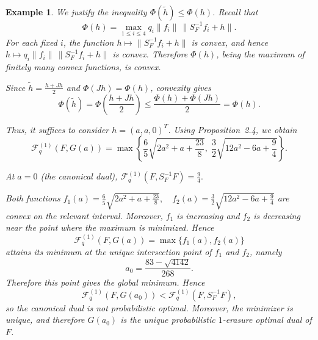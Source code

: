 \documentclass[final,1p,times]{elsarticle}
\newtheorem{example}[thm]{Example}
\begin{document}
\begin{example}
We justify the inequality $\Phi(\widetilde{h})\le \Phi(h)$. 
Recall that
\[
\Phi(h)=\max_{1\le i\le 4} q_i \|f_i\|\,\|S_F^{-1}f_i+h\|.
\]
For each fixed $i$, the function $h \mapsto \|S_F^{-1}f_i+h\|$
is convex, and hence $h \mapsto q_i\|f_i\|\,\|S_F^{-1}f_i+h\|$ is convex. Therefore $\Phi(h)$, being the maximum of finitely many convex functions, is convex.

Since $\widetilde{h}=\frac{h+Jh}{2}$ and $\Phi(Jh)=\Phi(h)$, convexity gives
\[
\Phi(\widetilde{h})
=
\Phi\!\left(\frac{h+Jh}{2}\right)
\le
\frac{\Phi(h)+\Phi(Jh)}{2}
=
\Phi(h).
\]

Thus, it suffices to consider $h=(a,a,0)^T$. Using Proposition~2.4, we obtain
\[
\mathcal{F}_q^{(1)}(F,G(a))
=
\max\left\{
\frac65\sqrt{2a^2+a+\frac{23}{8}},
\;
\frac32\sqrt{12a^2-6a+\frac94}
\right\}.
\]

At $a=0$ (the canonical dual), $\mathcal{F}_q^{(1)}(F,S_F^{-1}F)=\frac94.$

Both functions
\(
f_1(a)=\frac65\sqrt{2a^2+a+\frac{23}{8}},
\quad
f_2(a)=\frac32\sqrt{12a^2-6a+\frac94}
\)
are convex on the relevant interval. Moreover, \(f_1\) is increasing and \(f_2\) is decreasing near the point where the maximum is minimized. Hence
\[
\mathcal F_q^{(1)}(F,G(a))=\max\{f_1(a),f_2(a)\}
\]
attains its minimum at the unique intersection point of \(f_1\) and \(f_2\), namely
\[
a_0=\frac{83-\sqrt{4142}}{268}.
\]
Therefore this point gives the global minimum. Hence
\[
\mathcal{F}_q^{(1)}(F,G(a_0))<\mathcal{F}_q^{(1)}(F,S_F^{-1}F),
\]
so the canonical dual is not probabilistic optimal. Moreover, the minimizer is unique, and therefore $G(a_0)$ is the unique probabilistic $1$-erasure optimal dual of $F$.
\end{example}

\end{document}
